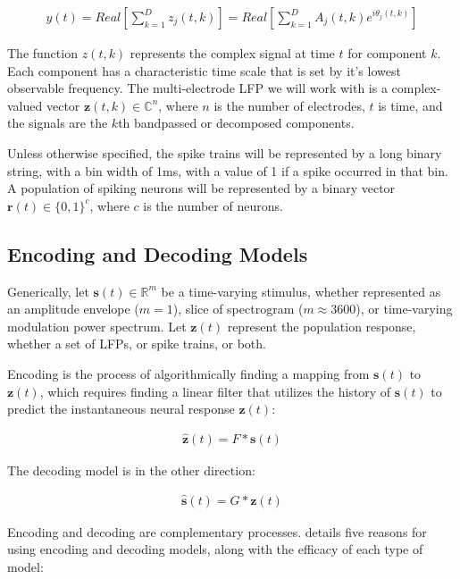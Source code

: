 \documentclass[12pt,article,oneside]{memoir}
\begin{document}
\begin{align}
y(t) = Real \left[ \sum_{k=1}^D z_{j}(t, k) \right] = Real \left[ \sum_{k=1}^D A_{j}(t, k) e^{i \theta_{j}(t, k)} \right]
\end{align}

The function $z(t, k)$ represents the complex signal at time $t$ for component $k$. Each
component has a characteristic time scale that is set by it's lowest observable frequency.
The multi-electrode LFP we will work with is a complex-valued vector
$\bm{z}(t,k) \in \mathbb{C}^n$, where $n$ is the number of electrodes, $t$ is time,
and the signals are the $k$th bandpassed or decomposed components.

Unless otherwise specified, the spike trains will be represented by a long binary string, with
a bin width of 1ms, with a value of 1 if a spike occurred in that bin. A population of spiking
neurons will be represented by a binary vector $\bm{r}(t) \in \{0, 1\}^c$, where $c$ is the
number of neurons.

\subsection{Encoding and Decoding Models}

Generically, let $\bm{s}(t) \in \mathbb{R}^m$ be a time-varying stimulus, whether represented
as an amplitude envelope ($m=1$), slice of spectrogram ($m \approx 3600$), or time-varying
modulation power spectrum. Let $\bm{z}(t)$ represent the population response, whether a set
of LFPs, or spike trains, or both.

Encoding is the process of algorithmically finding a mapping from $\bm{s}(t)$ to $\bm{z}(t)$,
which requires finding a linear filter that utilizes the history of $\bm{s}(t)$ to predict the
instantaneous neural response $\bm{z}(t)$:

\begin{align}
\hat{\bm{z}}(t) = F * \bm{s}(t)
\end{align}

The decoding model is in the other direction:

\begin{align}
\hat{\bm{s}}(t) = G * \bm{z}(t)
\end{align}

Encoding and decoding are complementary processes. \cite{Naselaris2011} details five reasons
for using encoding and decoding models, along with the efficacy of each type of model:
\end{document}

